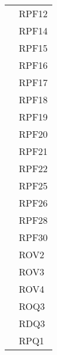 \begin{longtable}{| p{5cm} | p{5cm} |}
				&	RPF12 \\
				&	RPF14 \\
				&	RPF15 \\
				&	RPF16 \\
				&	RPF17 \\
				&	RPF18 \\
				&	RPF19 \\
				&	RPF20 \\
				&	RPF21 \\
				&	RPF22 \\
				&	RPF25 \\
				& 	RPF26 \\
				& 	RPF28 \\
				& 	RPF30 \\
				
				&	ROV2 \\
				&	ROV3 \\
				&	ROV4 \\
				&	ROQ3 \\
				&	RDQ3 \\
				&	RPQ1 \\
				 \hline
					

\end{longtable}
